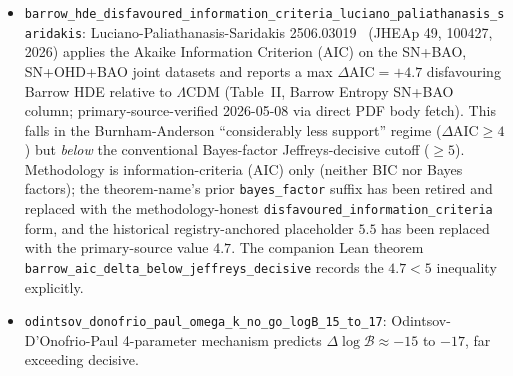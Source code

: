 \documentclass[aps,prd,reprint,nofootinbib,superscriptaddress]{revtex4-2}
\begin{document}
\begin{itemize}
  (DESI~DR2 + Pantheon$+$); extracted as the Tsallis-limit reading,
  $|\!\log\mathcal{B}| \gtrsim 6$ exceeds Jeffreys-decisive. The
  registry-anchored point estimate $6.2$ is conservative within the
  reported $-8$ to $-13$ aggregate range.
\item \texttt{barrow\_hde\_disfavoured\_information\_criteria\_luciano\_paliathanasis\_saridakis}:
  Luciano-Paliathanasis-Saridakis 2506.03019~\cite{LucianoPaliathanasisSaridakis2506} (JHEAp 49, 100427, 2026)
  applies the Akaike Information Criterion (AIC) on the SN+BAO,
  SN+OHD+BAO joint datasets and reports a max
  $\Delta\!\text{AIC} = +4.7$ disfavouring Barrow HDE relative to
  $\Lambda$CDM (Table~II, Barrow Entropy SN+BAO column;
  primary-source-verified 2026-05-08 via direct PDF body fetch). This
  falls in the Burnham-Anderson ``considerably less support'' regime
  ($\Delta\!\text{AIC} \geq 4$) but \emph{below} the conventional
  Bayes-factor Jeffreys-decisive cutoff ($\geq 5$). Methodology is
  information-criteria (AIC) only (neither BIC nor Bayes factors);
  the theorem-name's prior \texttt{bayes\_factor} suffix has been
  retired and replaced with the methodology-honest
  \texttt{disfavoured\_information\_criteria} form, and the historical
  registry-anchored placeholder $5.5$ has been replaced with the
  primary-source value $4.7$. The companion Lean theorem
  \texttt{barrow\_aic\_delta\_below\_jeffreys\_decisive} records the
  $4.7 < 5$ inequality explicitly.
\item \texttt{odintsov\_donofrio\_paul\_omega\_k\_no\_go\_logB\_15\_to\_17}:
  Odintsov-D'Onofrio-Paul 4-parameter mechanism predicts
  $\Delta\!\log\mathcal{B} \approx -15$ to $-17$, far exceeding decisive.
\end{itemize}
\end{document}
